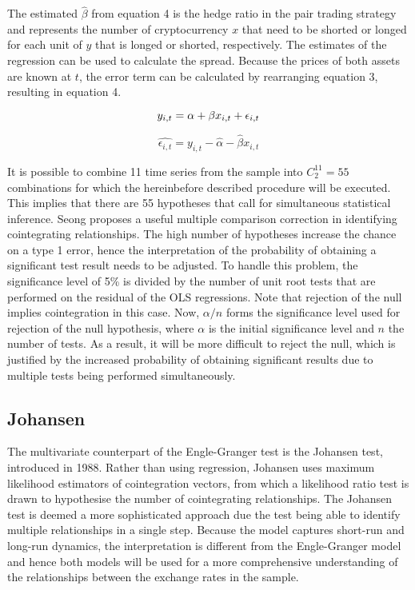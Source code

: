 \documentclass[12pt,english,authoryear]{article}
\begin{document}
The estimated $\hat{\beta}$ from equation 4 is the hedge ratio in the pair trading strategy and represents the number of cryptocurrency $x$ that need to be shorted or longed for each unit of $y$ that is longed or shorted, respectively. The estimates of the regression can be used to calculate the spread. Because the prices of both assets are known at $t$, the error term can be calculated by rearranging equation 3, resulting in equation 4.

\begin{equation}
    y_{i,t} = \alpha + \beta x_{i,t} + \epsilon_{i,t} \\
\end{equation}

\begin{equation}
\hat{\epsilon_{i,t}} = y_{i,t} - \hat{\alpha}-\hat{\beta}x_{i,t}
\end{equation}

It is possible to combine 11 time series from the sample into $C^{11}_2=55$ combinations for which the hereinbefore described procedure will be executed. This implies that there are 55 hypotheses that call for simultaneous statistical inference. Seong \citeyear{Seong_2009} proposes a useful multiple comparison correction in identifying cointegrating relationships. The high number of hypotheses increase the chance on a type 1 error, hence the interpretation of the probability of obtaining a significant test result needs to be adjusted. To handle this problem, the significance level of 5\% is divided by the number of unit root tests that are performed on the residual of the OLS regressions. Note that rejection of the null implies cointegration in this case. Now, $\alpha/n$ forms the significance level used for rejection of the null hypothesis, where $\alpha$ is the initial significance level and $n$ the number of tests. As a result, it will be more difficult to reject the null, which is justified by the increased probability of obtaining significant results due to multiple tests being performed simultaneously.

\subsection{Johansen} \label{sec:Johansen}

The multivariate counterpart of the Engle-Granger test is the Johansen test, introduced in 1988.  Rather than using regression, Johansen uses maximum likelihood estimators of cointegration vectors, from which a likelihood ratio test is drawn to hypothesise the number of cointegrating relationships. The Johansen test is deemed a more sophisticated approach due the test being able to identify multiple relationships in a single step. Because the model captures short-run and long-run dynamics, the interpretation is different from the Engle-Granger model and hence both models will be used for a more comprehensive understanding of the relationships between the exchange rates in the sample. 
\end{document}
